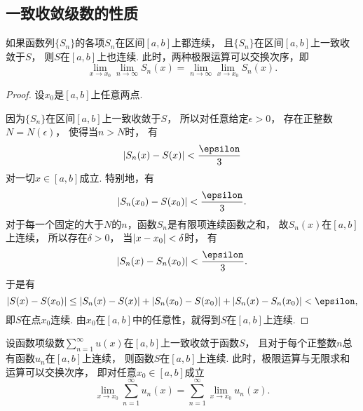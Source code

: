 \subsection{一致收敛级数的性质}
\begin{theorem}\label{theorem:无穷级数.一致收敛级数的基本性质1}
如果函数列\(\{S_n\}\)的各项\(S_n\)在区间\([a,b]\)上都连续，
且\(\{S_n\}\)在区间\([a,b]\)上一致收敛于\(S\)，
则\(S\)在\([a,b]\)上也连续.
此时，两种极限运算可以交换次序，即\[
	\lim_{x \to x_0} \lim_{n\to\infty} S_n(x)
	= \lim_{n\to\infty} \lim_{x \to x_0} S_n(x).
\]
\begin{proof}
设\(x_0\)是\([a,b]\)上任意两点.

因为\(\{S_n\}\)在区间\([a,b]\)上一致收敛于\(S\)，
所以对任意给定\(\epsilon>0\)，
存在正整数\(N = N(\epsilon)\)，
使得当\(n>N\)时，
有\[
	\abs{S_n(x) - S(x)} < \frac\epsilon3
\]对一切\(x\in[a,b]\)成立.
特别地，有\[
	\abs{S_n(x_0) - S(x_0)} < \frac\epsilon3.
\]
对于每一个固定的大于\(N\)的\(n\)，函数\(S_n\)是有限项连续函数之和，
故\(S_n(x)\)在\([a,b]\)上连续，
所以存在\(\delta>0\)，
当\(\abs{x - x_0} < \delta\)时，
有\[
	\abs{S_n(x) - S_n(x_0)} < \frac\epsilon3.
\]
于是有\[
	\abs{S(x) - S(x_0)}
	\leq \abs{S_n(x) - S(x)}
		+ \abs{S_n(x_0) - S(x_0)}
		+ \abs{S_n(x) - S_n(x_0)}
	< \epsilon,
\]
即\(S\)在点\(x_0\)连续.
由\(x_0\)在\([a,b]\)中的任意性，就得到\(S\)在\([a,b]\)上连续.
\end{proof}
\end{theorem}
\begin{theorem}
设函数项级数\(\sum_{n=1}^\infty u(x)\)在\([a,b]\)上一致收敛于函数\(S\)，
且对于每个正整数\(n\)总有函数\(u_n\)在\([a,b]\)上连续，
则函数\(S\)在\([a,b]\)上连续.
此时，极限运算与无限求和运算可以交换次序，
即对任意\(x_0\in[a,b]\)成立\[
	\lim_{x \to x_0} \sum_{n=1}^\infty u_n(x)
	= \sum_{n=1}^\infty \lim_{x \to x_0} u_n(x).
\]
\end{theorem}


